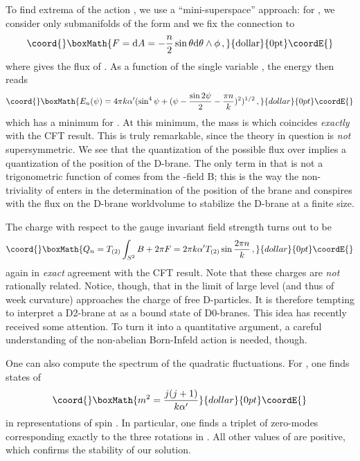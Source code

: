 \documentclass[a4paper,12pt]{article} \usepackage{amssymb,amsfonts,latexsym}
\begin{document}
To find extrema of the action , we use a ``mini-superspace''
approach: for \myHighlight{$\calb$}\coordHE{}, we consider only submanifolds of the form 
\coordHE{} and we fix the connection to 
$$\coord{}\boxMath{ F = \rmd A = -\frac n2 \sin\theta \rmd\theta\wedge \rm\phi \,, }{dollar}{0pt}\coordE{}$$
where \coordHE{} gives the flux of \coordHE{}.
As a function of the single variable \myHighlight{$\psi$}\coordHE{}, the energy then reads
$$\coord{}\boxMath{ E_n(\psi) = 4\pi k\alpha' (\sin^4\psi + (\psi-\frac{\sin2\psi}2 - 
\frac{\pi n}k)^2)^{1/2} \, , }{dollar}{0pt}\coordE{}$$
which has a minimum for \coordHE{}. At this minimum, the mass
is \coordHE{} which coincides {\em exactly}
with the CFT result. This is truly remarkable, since the theory in question
is {\em not} supersymmetric. We see that the quantization
of the possible flux \coordHE{} over \coordHE{} implies a quantization of the position
\myHighlight{$\psi$}\coordHE{} of the D-brane. The only term in \coordHE{} that is not a trigonometric 
function of \myHighlight{$\psi$}\coordHE{} comes from the \coordHE{}-field \erf B; this is the way the
non-triviality of \coordHE{} enters in the determination of the position of the
brane and conspires with the flux on the D-brane worldvolume to stabilize
the D-brane at a finite size.

The charge with respect to the gauge invariant field strength \myHighlight{$\calf$}\coordHE{} turns
out to be 
$$\coord{}\boxMath{ Q_n = T_{(2)} \int_{S^2} B + 2\pi F = 2\pi k \alpha' T_{(2)}
\sin\frac{2\pi n}k \, , }{dollar}{0pt}\coordE{}$$
again in {\em exact} agreement with the CFT result.
Note that these charges are {\em not} rationally related. Notice, though,
that in the limit of large level \coordHE{} (and thus of week curvature)
\coordHE{} approaches the charge of \coordHE{} free D-particles. It is therefore
tempting to interpret a D2-brane at \coordHE{} as a bound state of 
\coordHE{} D0-branes. This idea has recently received some attention. To turn it into
a quantitative argument, a careful understanding of the non-abelian Born-Infeld
action \cite{myer} is needed, though.

One can also compute the spectrum of the quadratic fluctuations. For 
\coordHE{}, one finds states of
$$\coord{}\boxMath{ m^2 = \frac{j(j+1)}{k\alpha'} }{dollar}{0pt}\coordE{}$$
in representations of spin \coordHE{}. In particular, one finds
a triplet of zero-modes corresponding exactly to the three rotations in \coordHE{}.
All other values of \coordHE{} are positive, which confirms the stability of our 
solution.
\end{document}
